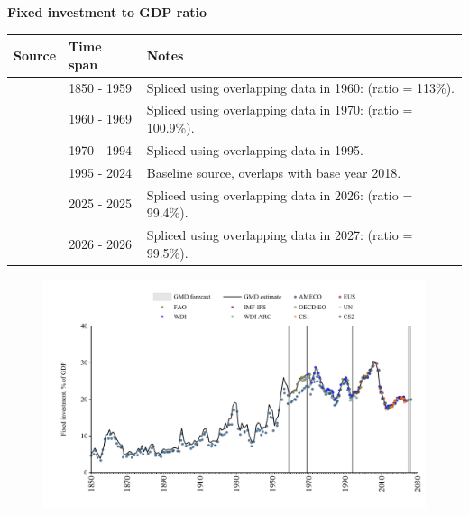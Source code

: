 \documentclass[12pt,a4paper,landscape]{article}
\begin{document}
\begin{adjustbox}{max totalsize={\paperwidth}{\paperheight},center}
\begin{minipage}[t][\textheight][t]{\textwidth}
\vspace*{0.5cm}
{}
\begin{center}
{\Large\bfseries Fixed investment to GDP ratio}
\end{center}
\vspace{0.5cm}
\begin{table}[H]
\centering
\small
\begin{tabular}{|l|l|l|}
\hline
\textbf{Source} & \textbf{Time span} & \textbf{Notes} \\
\hline
\rowcolor{white}\cite{CS2_ESP}& 1850 - 1959 &Spliced using overlapping data in 1960: (ratio = 113\%). \\
\rowcolor{lightgray}\cite{OECD_EO}& 1960 - 1969 &Spliced using overlapping data in 1970: (ratio = 100.9\%). \\
\rowcolor{white}\cite{WDI}& 1970 - 1994 &Spliced using overlapping data in 1995. \\
\rowcolor{lightgray}\cite{EUS}& 1995 - 2024 &Baseline source, overlaps with base year 2018. \\
\rowcolor{white}\cite{OECD_EO}& 2025 - 2025 &Spliced using overlapping data in 2026: (ratio = 99.4\%). \\
\rowcolor{lightgray}\cite{AMECO}& 2026 - 2026 &Spliced using overlapping data in 2027: (ratio = 99.5\%). \\
\hline
\end{tabular}
\end{table}
\begin{figure}[H]
\centering
\includegraphics[width=\textwidth,height=0.6\textheight,keepaspectratio]{graphs/ESP_finv_GDP.pdf}
\end{figure}
\end{minipage}
\end{adjustbox}
\end{document}
